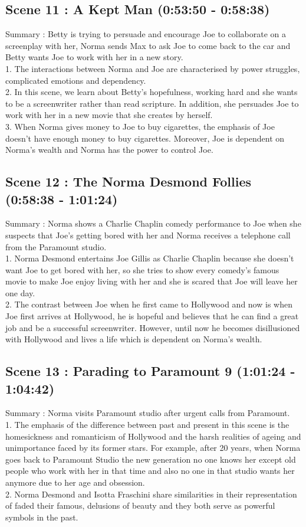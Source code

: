 \documentclass[a4paper]{article}
\begin{document}
\subsection{Scene 11 : A Kept Man (0:53:50 - 0:58:38)}
Summary : Betty is trying to persuade and encourage Joe to collaborate on a screenplay
with her, Norma sends Max to ask Joe to come back to the car and Betty wants Joe to work
with her in a new story.\\
1. The interactions between Norma and Joe are characterised by power struggles,
complicated emotions and dependency.\\
2. In this scene, we learn about Betty's hopefulness, working hard and she wants to be
a screenwriter rather than read scripture. In addition, she persuades Joe to work with
her in a new movie that she creates by herself.\\
3. When Norma gives money to Joe to buy cigarettes, the emphasis of Joe doesn’t
have enough money to buy cigarettes. Moreover, Joe is dependent on Norma’s
wealth and Norma has the power to control Joe.\\

\subsection{Scene 12 : The Norma Desmond Follies (0:58:38 - 1:01:24)}
Summary : Norma shows a Charlie Chaplin comedy performance to Joe when she suspects
that Joe’s getting bored with her and Norma receives a telephone call from the Paramount
studio.\\
1. Norma Desmond entertains Joe Gillis as Charlie Chaplin because she doesn’t want
Joe to get bored with her, so she tries to show every comedy's famous movie to
make Joe enjoy living with her and she is scared that Joe will leave her one day.\\
2. The contrast between Joe when he first came to Hollywood and now is when Joe first
arrives at Hollywood, he is hopeful and believes that he can find a great job and be a
successful screenwriter. However, until now he becomes disillusioned with Hollywood
and lives a life which is dependent on Norma’s wealth.\\

\subsection{Scene 13 : Parading to Paramount 9 (1:01:24 - 1:04:42)}
Summary : Norma visits Paramount studio after urgent calls from Paramount.\\
1. The emphasis of the difference between past and present in this scene is the
homesickness and romanticism of Hollywood and the harsh realities of ageing and
unimportance faced by its former stars. For example, after 20 years, when Norma
goes back to Paramount Studio the new generation no one knows her except old
people who work with her in that time and also no one in that studio wants her
anymore due to her age and obsession.\\
2. Norma Desmond and Isotta Fraschini share similarities in their representation of
faded their famous, delusions of beauty and they both serve as powerful symbols in
the past.\\
\end{document}
